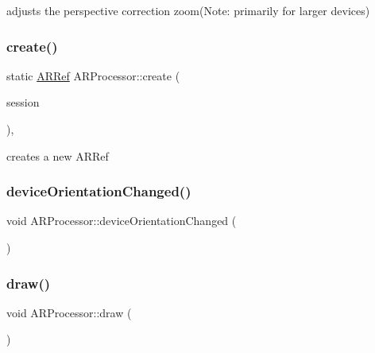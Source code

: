 adjusts the perspective correction zoom(\+Note\+: primarily for larger devices) 

\mbox{\label{class_a_r_processor_affa1cf36e94e3015c436fd30626dd773}} 
\subsubsection{\texorpdfstring{create()}{create()}}
{\footnotesize\ttfamily static \hyperlink{_a_r_processor_8h_aa8c5643290d0692cc71388c3f0f1623a}{A\+R\+Ref} A\+R\+Processor\+::create (\begin{DoxyParamCaption}\item[{A\+R\+Session $\ast$}]{session }\end{DoxyParamCaption})\hspace{0.3cm}{\ttfamily [inline]}, {\ttfamily [static]}}



creates a new A\+R\+Ref 

\mbox{\label{class_a_r_processor_ac065970f90243b08b9d004a4220d0345}} 
\subsubsection{\texorpdfstring{device\+Orientation\+Changed()}{deviceOrientationChanged()}}
{\footnotesize\ttfamily void A\+R\+Processor\+::device\+Orientation\+Changed (\begin{DoxyParamCaption}{ }\end{DoxyParamCaption})}

\mbox{\label{class_a_r_processor_a20418bd305702c3346a109da9e1afcb0}} 
\subsubsection{\texorpdfstring{draw()}{draw()}}
{\footnotesize\ttfamily void A\+R\+Processor\+::draw (\begin{DoxyParamCaption}{ }\end{DoxyParamCaption})}



